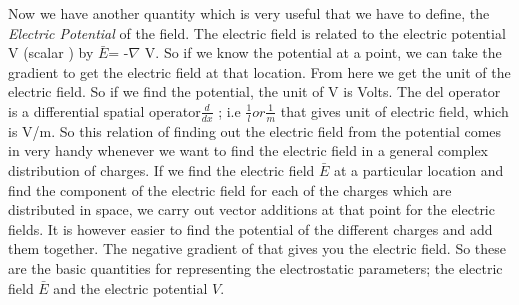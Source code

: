 Now we have another quantity which is very useful that we have to define, the \emph{Electric Potential} of the field. The electric field is related to the electric  potential V (scalar ) by 
$\bar{E}$= -$\nabla $ V.
So if we know the potential at a point, we can take the gradient to get the electric field at that location. From here we get the unit of the electric field. So if we find the potential, the unit of V is Volts. The del operator is a differential spatial operator$\frac{d}{dx}$ ; i.e $\frac{1}{l} or\frac{1}{m}$ that gives unit of electric field, which is V/m. So this relation of finding out the electric field from the potential comes in very handy whenever we want to find the electric field in a general complex distribution of charges. If we find the electric field  $\bar{E}$ at a particular location and find the component of the electric field for each of the charges which are distributed in space, we carry out vector additions at that point for the electric fields. It is however easier to find the potential of the different charges and add them together. The negative gradient of that gives you the electric field. So these are the basic quantities for representing the electrostatic parameters; the electric field  $\bar{E}$ and the electric potential $V$.

